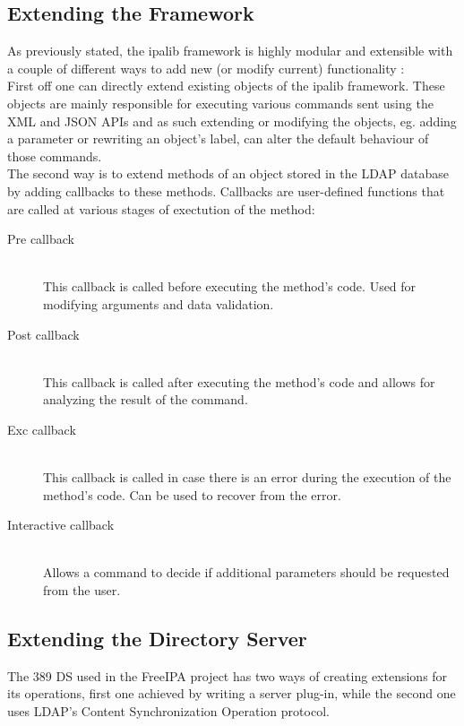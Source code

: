 \subsection{Extending the Framework}
As previously stated, the ipalib framework is highly modular and extensible with a couple of different ways to add new (or modify current) functionality \cite{extIpa}:\\
First off one can directly extend existing objects of the ipalib framework. These objects are mainly responsible for executing various commands sent using the XML and JSON APIs
and as such extending or modifying the objects, eg. adding a parameter or rewriting an object's label, can alter the default behaviour of those commands. \\
The second way is to extend methods of an object stored in the LDAP database by adding callbacks to these methods.
Callbacks are user-defined functions that are called at various stages of exectution of the method:
\begin{description}
    \item[Pre callback]\hfill \\This callback is called before executing the method's code. Used for modifying arguments and data validation.
    \item[Post callback]\hfill \\This callback is called after executing the method's code and allows for analyzing the result of the command.
    \item[Exc callback]\hfill \\This callback is called in case there is an error during the execution of the method's code. Can be used to recover from the error.
    \item[Interactive callback]\hfill \\Allows a command to decide if additional parameters should be requested from the user.
\end{description}
\subsection{Extending the Directory Server}
The 389 DS used in the FreeIPA project has two ways of creating extensions for its operations, first one achieved by writing a server plug-in, while the second one uses LDAP's Content Synchronization Operation protocol.
